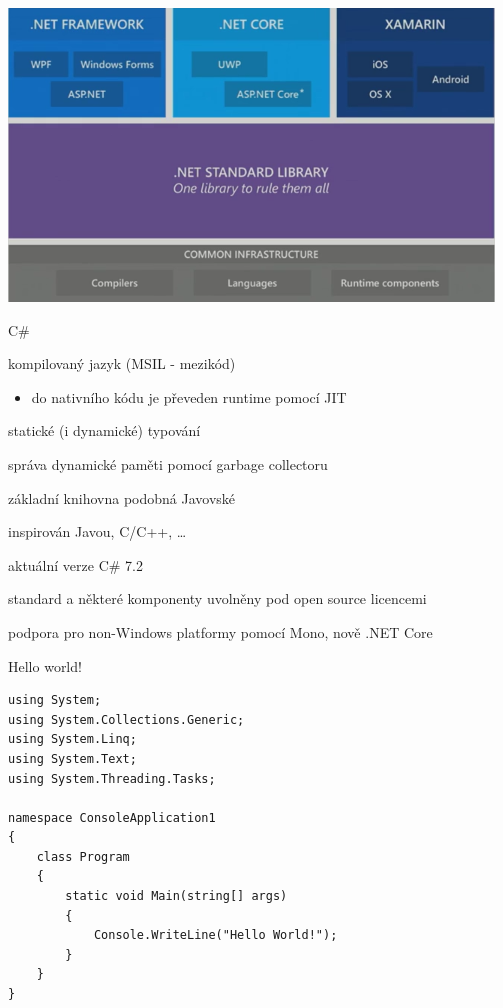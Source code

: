 \begin{frame}[fragile]
\begin{center}
\includegraphics[width=\textwidth]{img/net_standard.png}
\end{center}
\end{frame}

\begin{frame}[fragile]
\begin{bitemize}{C\#}
\item kompilovaný jazyk (MSIL - mezikód)
\begin{itemize}
\item do nativního kódu je převeden runtime pomocí JIT
\end{itemize}
\item statické (i dynamické) typování
\item správa dynamické paměti pomocí garbage collectoru
\item základní knihovna podobná Javovské
\item inspirován Javou, C/C++, \ldots
\item aktuální verze C\# 7.2
\item standard a některé komponenty uvolněny pod open source licencemi
\item podpora pro non-Windows platformy pomocí Mono, nově .NET Core

\end{bitemize}
\end{frame}


\begin{frame}[fragile]
\begin{exampleblock}{Hello world!}
\begin{lstlisting}[basicstyle=\small]
using System;
using System.Collections.Generic;
using System.Linq;
using System.Text;
using System.Threading.Tasks;

namespace ConsoleApplication1
{
    class Program
    {
        static void Main(string[] args)
        {
            Console.WriteLine("Hello World!");
        }
    }
}
\end{lstlisting}
\end{exampleblock}
\end{frame}


